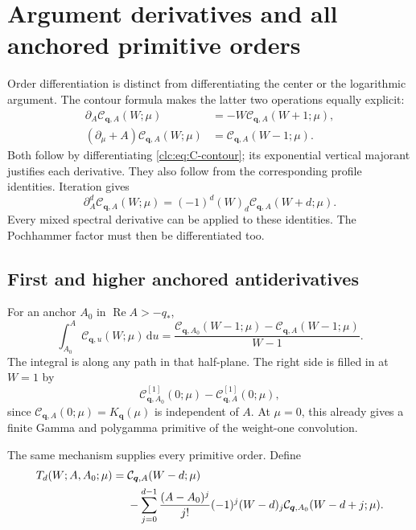 \documentclass[11pt,a4paper]{article}
\numberwithin{equation}{section}
\theoremstyle{definition}\newtheorem{definition}[theorem]{Definition}
\theoremstyle{remark}\newtheorem{remark}[theorem]{Remark}
\DeclareMathOperator{\Rea}{Re}
\newcommand{\dd}{\,\mathrm d}
\newcommand{\bq}{\boldsymbol q}\newcommand{\bs}{\boldsymbol s}
\newcommand{\CC}{\mathcal C}\newcommand{\UU}{\mathcal U}\newcommand{\EE}{\mathcal E}
\begin{document}
\section{Argument derivatives and all anchored primitive orders}
\label{clc:sec:primitives}

Order differentiation is distinct from differentiating the center or
the logarithmic argument. The contour formula makes the latter two
operations equally explicit:
\begin{align}
 \partial_A\CC_{\bq,A}(W;\mu)
      &=-W\CC_{\bq,A}(W+1;\mu),\label{clc:eq:A-ladder}\\
 (\partial_\mu+A)\CC_{\bq,A}(W;\mu)
      &=\CC_{\bq,A}(W-1;\mu).
 \label{clc:eq:mu-ladder}
\end{align}
Both follow by differentiating \eqref{clc:eq:C-contour}; its exponential
vertical majorant justifies each derivative. They also follow from the
corresponding profile identities. Iteration gives
\begin{equation}\label{clc:eq:A-higher}
 \partial_A^d\CC_{\bq,A}(W;\mu)
       =(-1)^d(W)_d\CC_{\bq,A}(W+d;\mu).
\end{equation}
Every mixed spectral derivative can be applied to these identities.
The Pochhammer factor must then be differentiated too.

\subsection{First and higher anchored antiderivatives}
For an anchor $A_0$ in $\Rea A>-q_*$,
\begin{equation}\label{clc:eq:first-primitive}
 \int_{A_0}^A\CC_{\bq,u}(W;\mu)\dd u
 =\frac{\CC_{\bq,A_0}(W-1;\mu)
                  -\CC_{\bq,A}(W-1;\mu)}{W-1}.
\end{equation}
The integral is along any path in that half-plane. The right side is
filled in at $W=1$ by
\begin{equation}\label{clc:eq:first-resonant}
 \CC_{\bq,A_0}^{[1]}(0;\mu)-\CC_{\bq,A}^{[1]}(0;\mu),
\end{equation}
since $\CC_{\bq,A}(0;\mu)=K_{\bq}(\mu)$ is independent of $A$.
At $\mu=0$, this already gives a finite Gamma and polygamma primitive
of the weight-one convolution.

The same mechanism supplies every primitive order. Define
\begin{align}
 T_d(W;A,A_0;\mu)={}&\CC_{\bq,A}(W-d;\mu)\notag\\
 &-\sum_{j=0}^{d-1}\frac{(A-A_0)^j}{j!}(-1)^j(W-d)_j
             \CC_{\bq,A_0}(W-d+j;\mu).
 \label{clc:eq:T-d}
\end{align}
\end{document}

